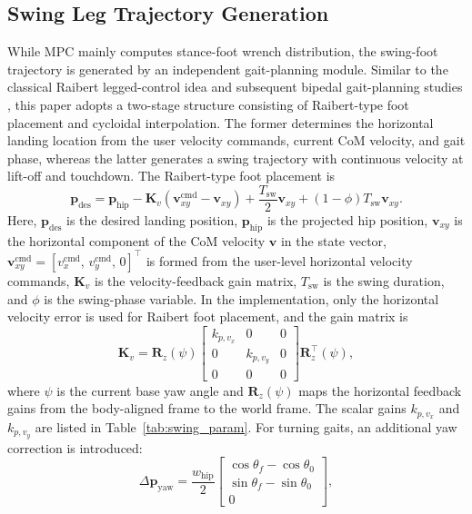 \documentclass[5p,times]{elsarticle}
\begin{document}
\subsection{Swing Leg Trajectory Generation}
While MPC mainly computes stance-foot wrench distribution, the swing-foot trajectory is generated by an independent gait-planning module. Similar to the classical Raibert legged-control idea and subsequent bipedal gait-planning studies \cite{ref63,ref79}, this paper adopts a two-stage structure consisting of Raibert-type foot placement and cycloidal interpolation. The former determines the horizontal landing location from the user velocity commands, current CoM velocity, and gait phase, whereas the latter generates a swing trajectory with continuous velocity at lift-off and touchdown. The Raibert-type foot placement is
\begin{equation}
\bm p_{\text{des}}
=\bm p_{\text{hip}}
-\bm K_v(\bm v_{xy}^{\mathrm{cmd}}-\bm v_{xy})
+\frac{T_{\text{sw}}}{2}\bm v_{xy}
+(1-\phi)T_{\text{sw}}\bm v_{xy}.
\label{eq:raibert}
\end{equation}
Here, $\bm p_{\text{des}}$ is the desired landing position, $\bm p_{\text{hip}}$ is the projected hip position, $\bm v_{xy}$ is the horizontal component of the CoM velocity $\bm v$ in the state vector, $\bm v_{xy}^{\mathrm{cmd}}=[v_x^{\mathrm{cmd}},\,v_y^{\mathrm{cmd}},\,0]^\top$ is formed from the user-level horizontal velocity commands, $\bm K_v$ is the velocity-feedback gain matrix, $T_{\text{sw}}$ is the swing duration, and $\phi$ is the swing-phase variable. In the implementation, only the horizontal velocity error is used for Raibert foot placement, and the gain matrix is
\begin{equation}
\bm K_v
=\bm R_z(\psi)
\begin{bmatrix}
k_{p,v_x} & 0 & 0\\
0 & k_{p,v_y} & 0\\
0 & 0 & 0
\end{bmatrix}
\bm R_z^\top(\psi),
\label{eq:swing_kv}
\end{equation}
where $\psi$ is the current base yaw angle and $\bm R_z(\psi)$ maps the horizontal feedback gains from the body-aligned frame to the world frame. The scalar gains $k_{p,v_x}$ and $k_{p,v_y}$ are listed in Table~\ref{tab:swing_param}. For turning gaits, an additional yaw correction is introduced:
\begin{equation}
\Delta \bm p_{\text{yaw}}
=\frac{w_{\text{hip}}}{2}
\begin{bmatrix}
\cos\theta_f-\cos\theta_0\\
\sin\theta_f-\sin\theta_0\\
0
\end{bmatrix},
\end{equation}
\end{document}
